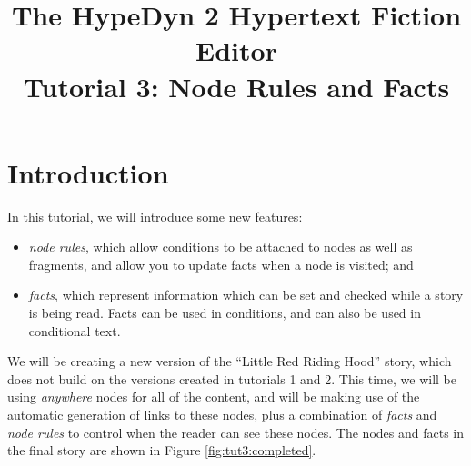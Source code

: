\documentclass{article}
\begin{document}
\title{The HypeDyn 2 Hypertext Fiction Editor\\Tutorial 3: Node Rules and Facts}
\date{}

\onecolumn
\maketitle

\tableofcontents

\section{Introduction}
In this tutorial, we will introduce some new features:

\begin{itemize}
  \item \textit{node rules}, which allow conditions to be attached to nodes as well
  as fragments, and allow you to update facts when a node is visited; and
  \item \textit{facts}, which represent information which can be set and checked while a story is being read. Facts can be used in conditions, and can also be used in conditional text.
\end{itemize}



\noindent We will be creating a new version of the ``Little Red Riding Hood'' story, which does not build on the versions created in tutorials 1 and 2. This time, we will be using \textit{anywhere} nodes for all of the content, and will be making use of the automatic generation of links to these nodes, plus a combination of \textit{facts} and \textit{node rules} to control when the reader can see these nodes. The nodes and facts in the final story are shown in Figure \ref{fig:tut3:completed}.
\end{document}
